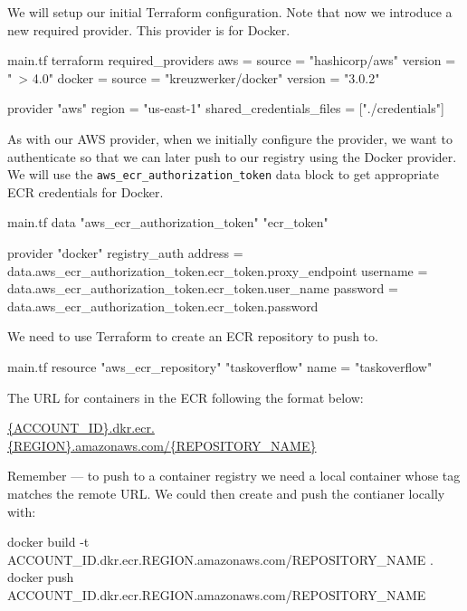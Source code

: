 \documentclass{csse4400}
\begin{document}
We will setup our initial Terraform configuration.
Note that now we introduce a new required provider.
This provider is for Docker.

\begin{code}[language=terraform,numbers=none]{main.tf}
terraform {
   required_providers {
      aws = {
         source = "hashicorp/aws"
         version = "~> 4.0"
      }
      docker = {
         source  = "kreuzwerker/docker"
         version = "3.0.2"
      }
   }
}

provider "aws" {
   region = "us-east-1"
   shared_credentials_files = ["./credentials"]
}
\end{code}

As with our AWS provider,
when we initially configure the provider,
we want to authenticate so that we can later push to our registry using the Docker provider.
We will use the \texttt{aws\_ecr\_authorization\_token} data block to get appropriate ECR credentials for Docker.

\begin{code}[language=terraform,numbers=none]{main.tf}
data "aws_ecr_authorization_token" "ecr_token" {}

provider "docker" {
  registry_auth {
    address  = data.aws_ecr_authorization_token.ecr_token.proxy_endpoint
    username = data.aws_ecr_authorization_token.ecr_token.user_name
    password = data.aws_ecr_authorization_token.ecr_token.password
  }
}
\end{code}

We need to use Terraform to create an ECR repository to push to.

\begin{code}[language=terraform,numbers=none]{main.tf}
resource "aws_ecr_repository" "taskoverflow" {
  name = "taskoverflow"
}
\end{code}

The URL for containers in the ECR following the format below:

\url{{ACCOUNT_ID}.dkr.ecr.{REGION}.amazonaws.com/{REPOSITORY_NAME}}

Remember --- to push to a container registry
we need a local container whose tag matches the remote URL.
We could then create and push the contianer locally with:

\begin{code}[language=bash,numbers=none]{}
docker build -t {ACCOUNT_ID}.dkr.ecr.{REGION}.amazonaws.com/{REPOSITORY_NAME} .
docker push {ACCOUNT_ID}.dkr.ecr.{REGION}.amazonaws.com/{REPOSITORY_NAME} 
\end{code}
\end{document}
